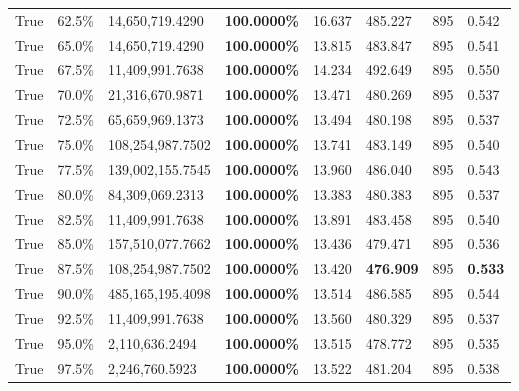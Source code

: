 \begin{table}[H]
\begin{tabular}{lllrllll}
\cline{1-8}
True & 62.5\% & 14,650,719.4290 & \bfseries \color{red} 100.0000\% & 16.637 & 485.227 & 895 & 0.542 \\
\cline{1-8}
True & 65.0\% & 14,650,719.4290 & \bfseries \color{red} 100.0000\% & 13.815 & 483.847 & 895 & 0.541 \\
\cline{1-8}
True & 67.5\% & 11,409,991.7638 & \bfseries \color{red} 100.0000\% & 14.234 & 492.649 & 895 & 0.550 \\
\cline{1-8}
True & 70.0\% & 21,316,670.9871 & \bfseries \color{red} 100.0000\% & 13.471 & 480.269 & 895 & 0.537 \\
\cline{1-8}
True & 72.5\% & 65,659,969.1373 & \bfseries \color{red} 100.0000\% & 13.494 & 480.198 & 895 & 0.537 \\
\cline{1-8}
True & 75.0\% & 108,254,987.7502 & \bfseries \color{red} 100.0000\% & 13.741 & 483.149 & 895 & 0.540 \\
\cline{1-8}
True & 77.5\% & 139,002,155.7545 & \bfseries \color{red} 100.0000\% & 13.960 & 486.040 & 895 & 0.543 \\
\cline{1-8}
True & 80.0\% & 84,309,069.2313 & \bfseries \color{red} 100.0000\% & 13.383 & 480.383 & 895 & 0.537 \\
\cline{1-8}
True & 82.5\% & 11,409,991.7638 & \bfseries \color{red} 100.0000\% & 13.891 & 483.458 & 895 & 0.540 \\
\cline{1-8}
True & 85.0\% & 157,510,077.7662 & \bfseries \color{red} 100.0000\% & 13.436 & 479.471 & 895 & 0.536 \\
\cline{1-8}
True & 87.5\% & 108,254,987.7502 & \bfseries \color{red} 100.0000\% & 13.420 & \bfseries \color{red} 476.909 & 895 & \bfseries \color{red} 0.533 \\
\cline{1-8}
True & 90.0\% & 485,165,195.4098 & \bfseries \color{red} 100.0000\% & 13.514 & 486.585 & 895 & 0.544 \\
\cline{1-8}
True & 92.5\% & 11,409,991.7638 & \bfseries \color{red} 100.0000\% & 13.560 & 480.329 & 895 & 0.537 \\
\cline{1-8}
True & 95.0\% & 2,110,636.2494 & \bfseries \color{red} 100.0000\% & 13.515 & 478.772 & 895 & 0.535 \\
\cline{1-8}
True & 97.5\% & 2,246,760.5923 & \bfseries \color{red} 100.0000\% & 13.522 & 481.204 & 895 & 0.538 \\
\cline{1-8}
\bottomrule
\end{tabular}
\end{table}
